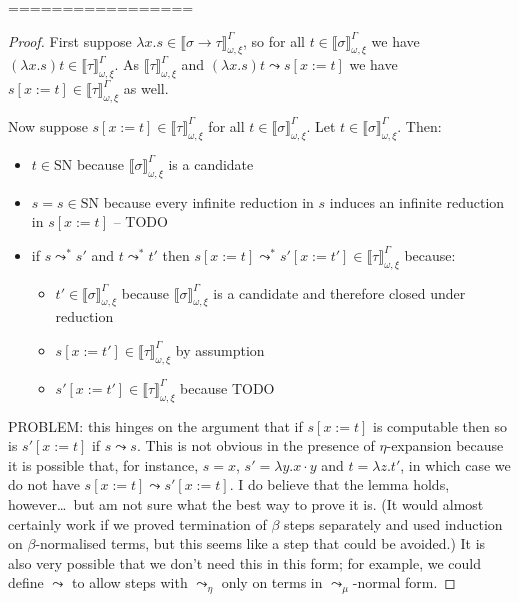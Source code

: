 \documentclass[runningheads,a4paper]{llncs}
\newcommand{\arreta}{\leadsto_\eta}
\newcommand{\arrnormalise}{\leadsto}
\newcommand{\normstep}{\leadsto_\mu}
\newcommand{\abs}[2]{\lambda #1.#2}
\newcommand{\app}[2]{#1 \cdot #2}
\newcommand{\SN}{\mathrm{SN}}
\newcommand{\val}[3]{\ensuremath{\llbracket#1\rrbracket_{#2}^{#3}}}
\begin{document}
=================

\begin{proof}
First suppose $\abs{x}{s} \in \val{\sigma \to \tau}{\omega,\xi}{\Gamma}$,
so for all $t \in \val{\sigma}{\omega,\xi}{\Gamma}$ we have
$(\abs{x}{s})t \in \val{\tau}{\omega,\xi}{\Gamma}$.  As
$\val{\tau}{\omega,\xi}{\Gamma}$ and $(\abs{x}{s})t \arrnormalise s[x:=
t]$ we have $s[x:=t] \in \val{\tau}{\omega,\xi}{\Gamma}$ as well.

Now suppose $s[x:=t] \in \val{\tau}{\omega,\xi}{\Gamma}$ for all $t \in
\val{\sigma}{\omega,\xi}{\Gamma}$.  Let $t \in \val{\sigma}{\omega,\xi}{
\Gamma}$.  Then:
\begin{itemize}
\item $t \in \SN$ because $\val{\sigma}{\omega,\xi}{\Gamma}$ is a
  candidate
\item $s = s \in \SN$ because every infinite reduction in $s$ induces
  an infinite reduction in $s[x:=t]$ -- TODO
\item if $s \arrnormalise^* s'$ and $t \arrnormalise^* t'$ then
  $s[x:=t] \arrnormalise^* s'[x:=t'] \in \val{\tau}{\omega,\xi}{\Gamma}$
  because:
  \begin{itemize}
  \item $t' \in \val{\sigma}{\omega,\xi}{\Gamma}$ because
    $\val{\sigma}{\omega,\xi}{\Gamma}$ is a candidate and therefore
    closed under reduction
  \item $s[x:=t'] \in \val{\tau}{\omega,\xi}{\Gamma}$ by assumption
  \item $s'[x:=t'] \in \val{\tau}{\omega,\xi}{\Gamma}$ because TODO
  \end{itemize}
\end{itemize}

PROBLEM: this hinges on the argument that if $s[x:=t]$ is computable
then so is $s'[x:=t]$ if $s \arrnormalise s$.  This is not obvious in
the presence of $\eta$-expansion because it is possible that, for
instance, $s = x$, $s' = \abs{y}{\app{x}{y}}$ and $t = \abs{z}{t'}$,
in which case we do not have $s[x:=t] \arrnormalise s'[x:=t]$.  I do
believe that the lemma holds, however\dots\ but am not sure what the
best way to prove it is. (It would almost certainly work if we proved
termination of $\beta$ steps separately and used induction on
$\beta$-normalised terms, but this seems like a step that could be
avoided.)  It is also very possible that we don't need this in this
form; for example, we could define $\arrnormalise$ to allow steps with
$\arreta$ only on terms in $\normstep$-normal form.
\end{proof}
\end{document}
